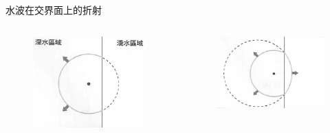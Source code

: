 \documentclass[13pt]{beamer}
\begin{document}
\begin{frame}{水波在交界面上的折射}
    \begin{columns}
        \begin{figure}
            \centering
            \includegraphics[width=1\linewidth]{images/Screenshot 2023-09-27 at 8.28.32 PM.png}


        \end{figure}
        \begin{figure}
            \centering
            \includegraphics[width=1\linewidth]{images/Screenshot 2023-09-27 at 8.28.43 PM.png}


        \end{figure}
    \end{columns}
\end{frame}
\end{document}

